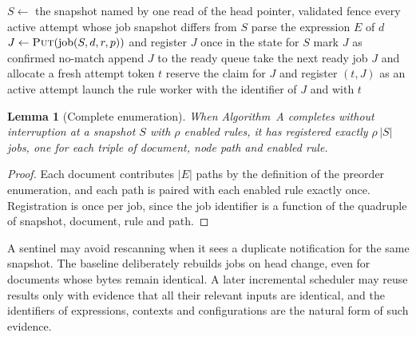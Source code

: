 \documentclass[11pt,a4paper]{article}
\theoremstyle{plain}
\newtheorem{lemma}[theorem]{Lemma}
\theoremstyle{definition}
\theoremstyle{remark}
\theoremstyle{definition}
\newcommand{\sz}[1]{\lvert #1\rvert}
\begin{document}
\begin{algorithm}
\caption{Observe and recruit.}
\label{alg:recruit}
\begin{algorithmic}[1]
 
  \State $S \gets$ the snapshot named by one read of the head pointer, validated
  \State fence every active attempt whose job snapshot differs from $S$
    \State parse the expression $E$ of $d$
        \State $J \gets \textsc{Put}(\mathrm{job}(S,d,r,p))$ and register $J$ once in the state for $S$
          \State mark $J$ as confirmed no-match
        \Else
          \State append $J$ to the ready queue
        \EndIf
      \EndFor
    \EndFor
  \EndFor
    \State take the next ready job $J$ and allocate a fresh attempt token $t$
    \State reserve the claim for $J$ and register $(t,J)$ as an active attempt
    \State launch the rule worker with the identifier of $J$ and with $t$
  \EndWhile
\EndProcedure
\end{algorithmic}
\end{algorithm}

\begin{lemma}[Complete enumeration]
\label{lem:enum}
When Algorithm~A completes without interruption at a snapshot $S$ with $\rho$ enabled rules, it has registered exactly $\rho\,\sz{S}$ jobs, one for each triple of document, node path and enabled rule.
\end{lemma}

\begin{proof}
Each document contributes $\sz{E}$ paths by the definition of the preorder enumeration, and each path is paired with each enabled rule exactly once. Registration is once per job, since the job identifier is a function of the quadruple of snapshot, document, rule and path.
\end{proof}

A sentinel may avoid rescanning when it sees a duplicate notification for the same snapshot. The baseline deliberately rebuilds jobs on head change, even for documents whose bytes remain identical. A later incremental scheduler may reuse results only with evidence that all their relevant inputs are identical, and the identifiers of expressions, contexts and configurations are the natural form of such evidence.
\end{document}

